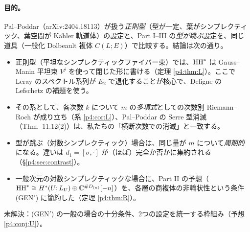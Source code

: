 \paragraph{目的。}
Pal--Poddar（arXiv:2404.18113）が扱う\emph{正則型}（型が一定、葉がシンプレクティック、葉空間が Kähler 軌道体）の設定と、Part I--III の\emph{型が跳ぶ}設定を、同じ道具（一般化 Dolbeault 複体 $C(L;E)$）で比較する。結論は次の通り。
\begin{itemize}
\item 正則型（平坦なシンプレクティックファイバー束）では、$\mathrm{HH}^*$ は Gauss--Manin 平坦束 $V^j$ を使って閉じた形に書ける（定理 \ref{p4:thm:L}）\tP。ここで Leray のスペクトル系列が $E_2$ で退化することが核心で、Deligne の Lefschetz の補題を使う。
\item その系として、各次数 $k$ について $m$ の\emph{多項式}としての次数別 Riemann--Roch が成り立ち（系 \ref{p4:cor:L}）、Pal--Poddar の Serre 型消滅（Thm.\ 11.12(2)）は、私たちの「横断次数での消滅」と一致する\tP。
\item 型が跳ぶ（対数シンプレクティック）場合は、同じ量が $m$ について\emph{周期的}になる。違いは $d_1=[\sigma,\cdot]$ が（ほぼ）完全か否かに集約される（\S\ref{p4:sec:contrast}）\tP\tV。
\item 一般次元の対数シンプレクティックな場合に、Part II の予想（$\mathrm{HH}^*\cong H^*(U;L_U)\oplus\mathbb C^{\#D_{(n)}}[-n]$）を、各層の商複体の非輪状性という条件 (GEN$'$) に簡約した（定理 \ref{p4:thm:R}）\tP。
\end{itemize}
未解決：(GEN$'$) の一般の場合の十分条件、2つの設定を統一する枠組み（予想 \ref{p4:conj:U}）。

